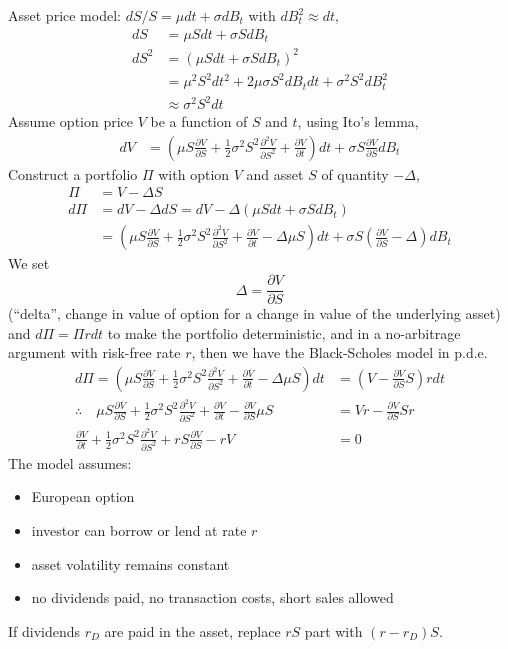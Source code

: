 \documentclass[9pt,twocolumn]{extarticle}
\begin{document}
Asset price model: $dS/S = \mu dt + \sigma dB_t$ with $dB_t^2 \approx dt$,
\begin{align*}
dS &= \mu S dt + \sigma S dB_t \\
dS^2 &= (\mu S dt + \sigma S dB_t)^2 \\
     &= \mu^2 S^2 dt^2 + 2\mu \sigma S^2 dB_t dt + \sigma^2 S^2 dB_t^2 \\
	 &\approx \sigma^2 S^2 dt
\end{align*}
Assume option price $V$ be a function of $S$ and $t$, using Ito's lemma,
\begin{align*}
dV
&= \left(\mu S \frac{\partial V}{\partial S} + \frac{1}{2}\sigma^2 S^2 \frac{\partial^2 V}{\partial S^2} + \frac{\partial V}{\partial t}\right) dt + \sigma S \frac{\partial V}{\partial S} dB_t
\end{align*}
Construct a portfolio $\Pi$ with option $V$ and asset $S$ of quantity $-\Delta$,
\begin{align*}
\Pi &= V - \Delta S \\
d\Pi &= dV - \Delta dS = dV - \Delta(\mu S dt + \sigma S dB_t)\\
&= \left(\mu S \frac{\partial V}{\partial S} + \frac{1}{2}\sigma^2 S^2 \frac{\partial^2 V}{\partial S^2} + \frac{\partial V}{\partial t} - \Delta\mu S\right) dt + \sigma S \left(\frac{\partial V}{\partial S} - \Delta\right) dB_t
\end{align*}
We set $$\Delta = \frac{\partial V}{\partial S}$$ (``delta'', change in value
of option for a change in value of the underlying asset) and $d\Pi = \Pi r dt$
to make the portfolio deterministic, and in a no-arbitrage argument with
risk-free rate $r$, then we have the Black-Scholes model in p.d.e.
\begin{align*}
d\Pi
= \left(\mu S \frac{\partial V}{\partial S} + \frac{1}{2}\sigma^2 S^2 \frac{\partial^2 V}{\partial S^2} + \frac{\partial V}{\partial t} - \Delta\mu S\right) dt
&= \left(V - \frac{\partial V}{\partial S} S\right)rdt \\
\therefore\quad 
\mu S \frac{\partial V}{\partial S} + \frac{1}{2}\sigma^2 S^2 \frac{\partial^2 V}{\partial S^2} + \frac{\partial V}{\partial t} - \frac{\partial V}{\partial S}\mu S
&= Vr - \frac{\partial V}{\partial S} Sr \\
\frac{\partial V}{\partial t} + \frac{1}{2}\sigma^2 S^2 \frac{\partial^2 V}{\partial S^2} + rS \frac{\partial V}{\partial S} - rV &= 0
\end{align*}
The model assumes:
\begin{itemize}
\item European option
\item investor can borrow or lend at rate $r$
\item asset volatility remains constant
\item no dividends paid, no transaction costs, short sales allowed
\end{itemize}
If dividends $r_D$ are paid in the asset, replace $rS$ part with $(r-r_D)S$.
\end{document}
